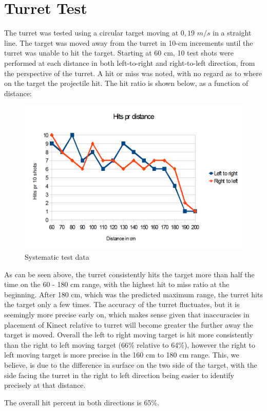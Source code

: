 \section{Turret Test}
The turret was tested using a circular target moving at $0,19$ $m/s$ in a straight line. 
The target was moved away from the turret in 10-cm increments until the turret was unable to hit the target. Starting at 60 cm, 10 test shots were performed at each distance in both left-to-right and right-to-left direction, from the perspective of the turret. A hit or miss was noted, with no regard as to where on the target the projectile hit. The hit ratio is shown below, as a function of distance:

\begin{figure}[hbtp]
	\includegraphics[scale=0.5]{img/test.png}
	\caption{Systematic test data}
	\label{systest}
\end{figure}

As can be seen above, the turret consistently hits the target more than half the time on the 60 - 180 cm range, with the highest hit to miss ratio at the beginning. After 180 cm, which was the predicted maximum range, the turret hits the target only a few times. The accuracy of the turret fluctuates, but it is seemingly more precise early on, which makes sense given that inaccuracies in placement of Kinect relative to turret will become greater the further away the target is moved. Overall the left to right moving target is hit more consistently than the right to left moving target (66\% relative to 64\%), however the right to left moving target is more precise in the 160 cm to 180 cm range. This, we believe, is due to the difference in surface on the two side of the target, with the side facing the turret in the right to left direction being easier to identify precisely at that distance.

The overall hit percent in both directions is 65\%.
